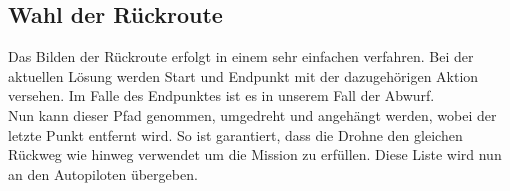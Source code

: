 \subsection{Wahl der Rückroute}
Das Bilden der Rückroute erfolgt in einem sehr einfachen verfahren. Bei der aktuellen Lösung werden Start und Endpunkt mit der dazugehörigen Aktion versehen. Im Falle des Endpunktes ist es in unserem Fall der Abwurf.
\\
Nun kann dieser Pfad genommen, umgedreht und angehängt werden, wobei der letzte Punkt entfernt wird. So ist garantiert, dass die Drohne den gleichen Rückweg wie hinweg verwendet um die Mission zu erfüllen. Diese Liste wird nun an den Autopiloten übergeben.
